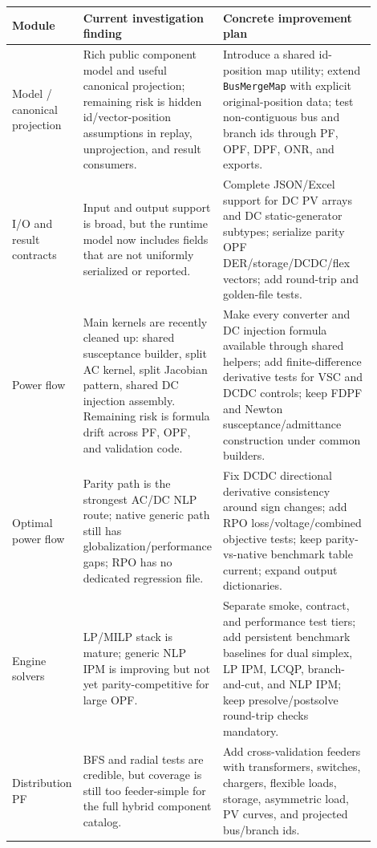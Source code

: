 \begin{longtable}{@{}L{0.17\linewidth}L{0.28\linewidth}L{0.45\linewidth}@{}}
\toprule
Module & Current investigation finding & Concrete improvement plan \\
\midrule
\endhead
Model / canonical projection & Rich public component model and useful canonical projection; remaining risk is hidden id/vector-position assumptions in replay, unprojection, and result consumers. & Introduce a shared id-position map utility; extend \texttt{BusMergeMap} with explicit original-position data; test non-contiguous bus and branch ids through PF, OPF, DPF, ONR, and exports. \\
I/O and result contracts & Input and output support is broad, but the runtime model now includes fields that are not uniformly serialized or reported. & Complete JSON/Excel support for DC PV arrays and DC static-generator subtypes; serialize parity OPF DER/storage/DCDC/flex vectors; add round-trip and golden-file tests. \\
Power flow & Main kernels are recently cleaned up: shared susceptance builder, split AC kernel, split Jacobian pattern, shared DC injection assembly.  Remaining risk is formula drift across PF, OPF, and validation code. & Make every converter and DC injection formula available through shared helpers; add finite-difference derivative tests for VSC and DCDC controls; keep FDPF and Newton susceptance/admittance construction under common builders. \\
Optimal power flow & Parity path is the strongest AC/DC NLP route; native generic path still has globalization/performance gaps; RPO has no dedicated regression file. & Fix DCDC directional derivative consistency around sign changes; add RPO loss/voltage/combined objective tests; keep parity-vs-native benchmark table current; expand output dictionaries. \\
Engine solvers & LP/MILP stack is mature; generic NLP IPM is improving but not yet parity-competitive for large OPF. & Separate smoke, contract, and performance test tiers; add persistent benchmark baselines for dual simplex, LP IPM, LCQP, branch-and-cut, and NLP IPM; keep presolve/postsolve round-trip checks mandatory. \\
Distribution PF & BFS and radial tests are credible, but coverage is still too feeder-simple for the full hybrid component catalog. & Add cross-validation feeders with transformers, switches, chargers, flexible loads, storage, asymmetric load, PV curves, and projected bus/branch ids. \\

\end{longtable}

